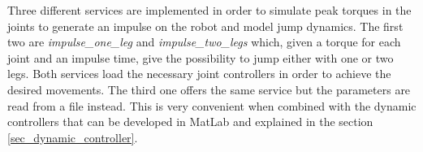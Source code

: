 Three different services are implemented in order to simulate peak torques in the joints to generate an impulse on the robot and model jump dynamics.
The first two are \textit{impulse\_one\_leg} and \textit{impulse\_two\_legs} which, given a torque for each joint and an impulse time, give the possibility to jump either with one or two legs.
Both services load the necessary joint controllers in order to achieve the desired movements.
The third one offers the same service but the parameters are read from a file instead.
This is very convenient when combined with the dynamic controllers that can be developed in MatLab and explained in the section \ref{sec_dynamic_controller}.

